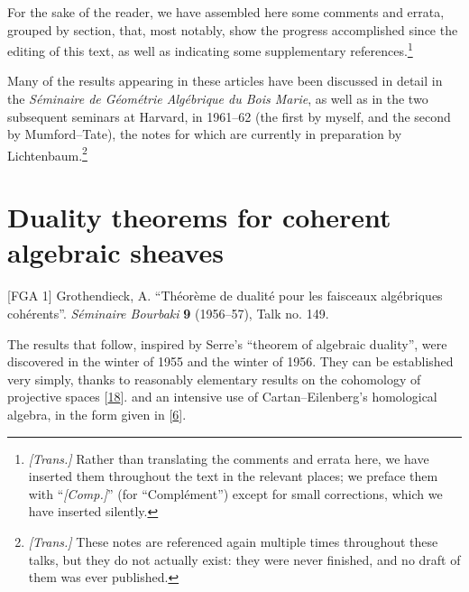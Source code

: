 \documentclass{article}
\newcommand{\oldpage}[1]{\marginpar{\footnotesize$\Big\vert$ \textit{p.~#1}}}
\theoremstyle{definition}
\theoremstyle{definition}
\theoremstyle{definition}
\theoremstyle{definition}
\theoremstyle{remark}
\begin{document}
For the sake of the reader, we have assembled here some comments and errata, grouped by section, that, most notably, show the progress accomplished since the editing of this text, as well as indicating some supplementary references.\footnote{\emph{{[}Trans.{]}} Rather than translating the comments and errata here, we have inserted them throughout the text in the relevant places; we preface them with ``\emph{{[}Comp.{]}}'' (for ``Complément'') except for small corrections, which we have inserted silently.}

Many of the results appearing in these articles have been discussed in detail in the \emph{Séminaire de Géométrie Algébrique du Bois Marie}, as well as in the two subsequent seminars at Harvard, in 1961--62 (the first by myself, and the second by Mumford--Tate), the notes for which are currently in preparation by Lichtenbaum.\footnote{\emph{{[}Trans.{]}} These notes are referenced again multiple times throughout these talks, but they do not actually exist: they were never finished, and no draft of them was ever published.}

\hypertarget{fga-1}{%
\section{Duality theorems for coherent algebraic sheaves}\label{fga-1}}

\providecommand{\scr}[1]{{\mathscr{#1}}}
\renewcommand{\cal}[1]{{\mathcal{#1}}}
\renewcommand{\frak}[1]{{\mathfrak{#1}}}
\renewcommand{\geq}{\geqslant}
\renewcommand{\leq}{\leqslant}

\providecommand{\from}{\leftarrow}
\providecommand{\bb}{\mathbf}

\providecommand{\Ext}{\operatorname{Ext}}
\providecommand{\shExt}{\mathscr{E}\kern -.5pt xt}
\providecommand{\Hom}{\operatorname{Hom}}
\providecommand{\shHom}{\mathscr{H}\kern -.5pt om}
\providecommand{\Tor}{\operatorname{Tor}}
\providecommand{\RR}{\operatorname{R}}
\providecommand{\HH}{\operatorname{H}}

{[}FGA 1{]}
Grothendieck, A.
``Théorème de dualité pour les faisceaux algébriques cohérents''.
\emph{Séminaire Bourbaki} \textbf{9} (1956--57), Talk no. 149.

\oldpage{149-01}The results that follow, inspired by Serre's ``theorem of algebraic duality'', were discovered in the winter of 1955 and the winter of 1956.
They can be established very simply, thanks to reasonably elementary results on the cohomology of projective spaces {[}\protect\hyperlink{ref-Ser1955}{18}{]}. and an intensive use of Cartan--Eilenberg's homological algebra, in the form given in {[}\protect\hyperlink{ref-Gro1957}{6}{]}.
\end{document}
